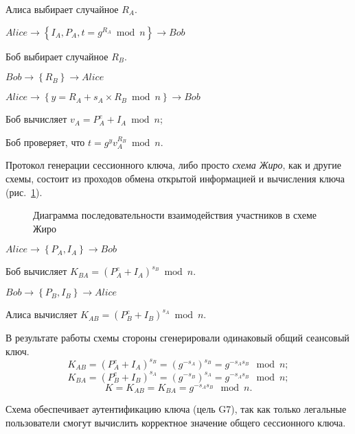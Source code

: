 \begin{protocol}
    \item[(1)] Алиса выбирает случайное $R_A$.
    \item[{}] $Alice \to \left\{ I_A, P_A, t = g^{R_A} \bmod n \right\} \to Bob$
    \item[(2)] Боб выбирает случайное $R_B$.
    \item[{}] $Bob \to \left\{ R_B \right\} \to Alice$
    \item[(3)] $Alice \to \left\{ y = R_A + s_A \times R_B \bmod n \right\} \to Bob$
    \item[(4)] Боб вычисляет $v_A = P_A^e + I_A \bmod n $;
    \item[{}] Боб проверяет, что $t = g^ y v_A^{R_B} \bmod n$.
\end{protocol}

Протокол генерации сессионного ключа, либо просто \emph{схема Жиро}, как и другие схемы, состоит из проходов обмена открытой информацией и вычисления ключа (рис.~\ref{fig:key_distribution-girault-scheme}).

\begin{figure}
	\centering
	\begin{sequencediagram}

	\end{sequencediagram}
	\caption{Диаграмма последовательности взаимодействия участников в схеме Жиро\label{fig:key_distribution-girault-scheme}}
\end{figure}

\begin{protocol}
    \item[(1)] $Alice \to \left\{ P_A, I_A \right\} \to Bob$
    \item[(2)] Боб вычисляет $K_{BA} = (P_A^e + I_A)^{s_B} \bmod n$.
    \item[{}] $Bob \to \left\{ P_B, I_B \right\} \to Alice$
    \item[(3)] Алиса вычисляет $K_{AB} = (P_B^e + I_B)^{s_A} \bmod n$.
\end{protocol}

В результате работы схемы стороны сгенерировали одинаковый общий сеансовый ключ.
\[ K_{AB} = (P_A^e + I_A)^{s_B} = (g^{-s_A})^{s_B} = g^{-s_As_B} \mod n; \]
\[ K_{BA} = (P_B^e + I_B)^{s_A} = (g^{-s_B})^{s_A} = g^{-s_As_B} \mod n; \]
            \[ K = K_{AB} = K_{BA} = g^{-s_As_B} \mod n. \]

Схема обеспечивает аутентификацию ключа (цель G7), так как только легальные пользователи смогут вычислить корректное значение общего сессионного ключа.

